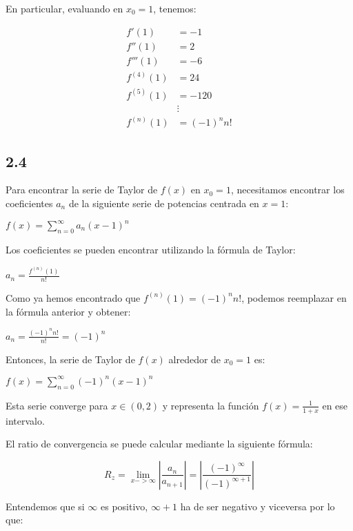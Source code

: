 \documentclass[12pt]{article}
\begin{document}
        En particular, evaluando en $x_0=1$, tenemos:
        
        \begin{align}
          f'(1) &= -1 \\
          f''(1) &= 2 \\
          f'''(1) &= -6 \\
          f^{(4)}(1) &= 24 \\
          f^{(5)}(1) &= -120 \\
          &\vdots \\
          f^{(n)}(1) &= (-1)^{n}n!
        \end{align}

      \subsection{2.4}
        
        Para encontrar la serie de Taylor de $f(x)$ en $x_0=1$, necesitamos encontrar los coeficientes $a_n$ de la siguiente serie de potencias centrada en $x=1$:

        $f(x) = \sum_{n=0}^{\infty} a_n (x-1)^n$
        
        Los coeficientes se pueden encontrar utilizando la fórmula de Taylor:
        
        $a_n = \frac{f^{(n)}(1)}{n!}$
        
        Como ya hemos encontrado que $f^{(n)}(1) = (-1)^n n!$, podemos reemplazar en la fórmula anterior y obtener:
        
        $a_n = \frac{(-1)^n n!}{n!} = (-1)^n$
        
        Entonces, la serie de Taylor de $f(x)$ alrededor de $x_0=1$ es:
        
        $f(x) = \sum_{n=0}^{\infty} (-1)^n (x-1)^n$
        
        Esta serie converge para $x \in (0,2)$ y representa la función $f(x) = \frac{1}{1+x}$ en ese intervalo.

        El ratio de convergencia se puede calcular mediante la siguiente fórmula:

        \begin{equation}
          R_{z}= \lim_{x-> \infty}|\frac{a_{n}}{a_{n+1}}| = |\frac{(-1)^\infty}{(-1)^{\infty+1}}|
        \end{equation}
        
        Entendemos que si $\infty$ es positivo, $\infty+1$ ha de ser negativo y viceversa por lo que:
        
\end{document}
